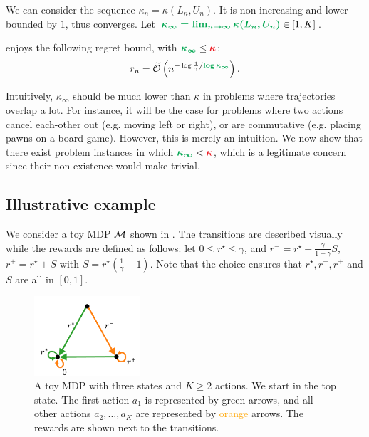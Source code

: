 \documentclass[runningheads]{llncs}
\begin{document}
We can consider the sequence $\kappa_n = \kappa(L_n, U_n)$. It is non-increasing and lower-bounded by $1$, thus converges. Let $\hlgb{\kappa_\infty = \lim_{n\rightarrow\infty} \kappa(L_n, U_n)} \in[1,K]$.

\begin{theorem}
\label{thm:regret-gbop}
\GBOPD enjoys the following regret bound, with $\hlgb{\kappa_\infty} \leq \hlrb{\kappa}$: 
\begin{align*}
r_n = \tilde{\cO}\left(n^{-\log \frac{1}{\gamma}/\hlgb{\log \kappa_\infty}}\right).
\end{align*}
\end{theorem}

Intuitively, $\kappa_\infty$ should be much lower than $\kappa$ in problems where trajectories overlap a lot. For instance, it will be the case for problems where two actions cancel each-other out (e.g. moving left or right), or are commutative (e.g. placing pawns on a board game). However, this is merely an intuition. We now show that there exist problem instances in which $\hlgb{\kappa_\infty} < \hlrb{\kappa}$, which is a legitimate concern since their non-existence would make  trivial.

\subsection{Illustrative example}

We consider a toy MDP $\mathcal{M}$ shown in . The transitions are described visually while the rewards are defined as follows: let $0\leq r^\star\leq \gamma$, and $ r^- = r^\star - \frac{\gamma}{1-\gamma} S$, $r^+ = r^\star + S$ with $S = r^\star\left(\frac{1}{\gamma} - 1\right).$ Note that the choice ensures that $r^\star, r^-, r^+$ and $S$ are all in $[0, 1]$.

\begin{figure}[htp]
    \centering
    \includegraphics[trim={0.5cm 0.0cm 0.3cm 0.6cm}, clip, width=0.35\textwidth]{img/mdp.pdf}
    \caption{A toy MDP with three states and $K \geq 2$ actions. We start in the top state. The first action $a_1$ is represented by \textcolor{OliveGreen}{green} arrows, and all other actions $a_2, \dots, a_K$ are represented by \textcolor{Orange}{orange} arrows. The rewards are shown next to the transitions.}
    \label{fig:mdp}
\end{figure}
\end{document}
